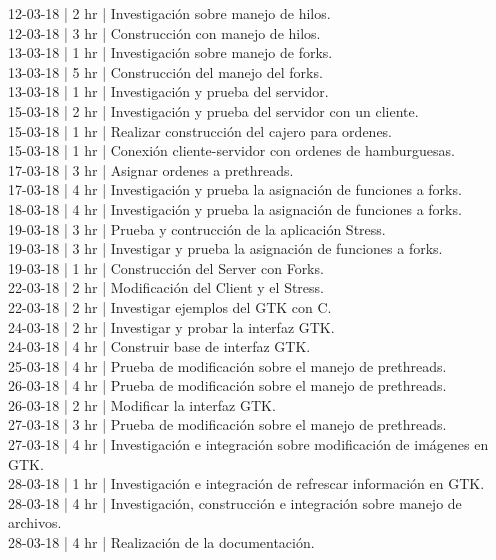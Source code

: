 \documentclass{article}
\begin{document}
12-03-18 | 2 hr | Investigación sobre manejo de hilos. \\ [1ex]
12-03-18 | 3 hr | Construcción con manejo de hilos. \\ [1ex]
13-03-18 | 1 hr | Investigación sobre manejo de forks. \\ [1ex]
13-03-18 | 5 hr | Construcción del manejo del forks. \\ [1ex]
13-03-18 | 1 hr | Investigación y prueba del servidor. \\ [1ex]
15-03-18 | 2 hr | Investigación y prueba del servidor con un cliente. \\ [1ex]
15-03-18 | 1 hr | Realizar construcción del cajero para ordenes. \\ [1ex]
15-03-18 | 1 hr | Conexión cliente-servidor con ordenes de hamburguesas. \\ [1ex]
17-03-18 | 3 hr | Asignar ordenes a prethreads. \\ [1ex]
17-03-18 | 4 hr | Investigación y prueba la asignación de funciones a forks. \\ [1ex]
18-03-18 | 4 hr | Investigación y prueba la asignación de funciones a forks. \\ [1ex]
19-03-18 | 3 hr | Prueba y contrucción de la aplicación Stress. \\ [1ex]
19-03-18 | 3 hr | Investigar y prueba la asignación de funciones a forks. \\ [1ex]
19-03-18 | 1 hr | Construcción del Server con Forks. \\ [1ex]
22-03-18 | 2 hr | Modificación del Client y el Stress. \\ [1ex]
22-03-18 | 2 hr | Investigar ejemplos del GTK con C. \\ [1ex]
24-03-18 | 2 hr | Investigar y probar la interfaz GTK. \\ [1ex]
24-03-18 | 4 hr | Construir base de interfaz GTK. \\ [1ex]
25-03-18 | 4 hr | Prueba de modificación sobre el manejo de prethreads. \\ [1ex]
26-03-18 | 4 hr | Prueba de modificación sobre el manejo de prethreads. \\ [1ex]
26-03-18 | 2 hr | Modificar la interfaz GTK. \\ [1ex]
27-03-18 | 3 hr | Prueba de modificación sobre el manejo de prethreads. \\ [1ex]
27-03-18 | 4 hr | Investigación e integración sobre modificación de imágenes en GTK. \\ [1ex]
28-03-18 | 1 hr | Investigación e integración de refrescar información en GTK. \\ [1ex]
28-03-18 | 4 hr | Investigación, construcción e integración sobre manejo de archivos. \\ [1ex]
28-03-18 | 4 hr | Realización de la documentación. \\ [1ex]
\end{document}
